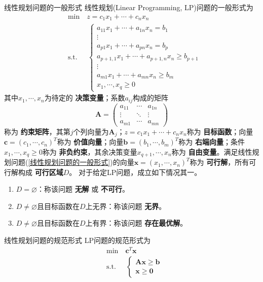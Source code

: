 \documentclass[lang = cn, scheme = chinese, thmcnt = section]{elegantbook}
\newcommand{\bs}{\boldsymbol}          %
\begin{document}
\begin{definition}{线性规划问题的一般形式}
	线性规划(Linear Programming, LP)问题的一般形式为
	\begin{align*}\label{线性规划问题的一般形式}
		& \text{min}  \quad z = c_1 x_1 + \cdots + c_n x_n\\
		& \text{s.t.} \;\, \quad \begin{cases}
			a_{11} x_1 + \cdots + a_{1n} x_n = b_1 \\
			\vdots \\
			a_{p1} x_1 + \cdots + a_{pn} x_n = b_p \\
			a_{p+1,1} x_1 + \cdots + a_{p+1,n} x_n \ge b_{p+1} \\
			\vdots \\
			a_{m1} x_1 + \cdots + a_{mn} x_n \ge b_m \\
			x_1,\cdots,x_q\ge 0
		\end{cases}\tag{*}
	\end{align*}
	其中$x_1,\cdots,x_n$为待定的 {\bf{决策变量}}；系数$a_{ij}$构成的矩阵
	$$
	\bs{A}=\begin{pmatrix}
		a_{11} & \cdots & a_{1n}\\
		\vdots & \ddots & \vdots\\
		a_{m1} & \cdots & a_{mn}
	\end{pmatrix}
	$$
	称为 {\bf{约束矩阵}}，其第$j$个列向量为$\bs{A}_j$；$z = c_1 x_1 + \cdots + c_n x_n$称为 {\bf{目标函数}}；向量$\bs{c}=(c_1,\cdots,c_n)^T$称为 {\bf{价值向量}}；向量$\bs{b}=(b_1,\cdots,b_m)^T$称为 {\bf{右端向量}}；条件$x_1,\cdots,x_q\ge 0$称为 {\bf{非负约束}}，其余决策变量$x_{q+1},\cdots,x_{n}$称为 {\bf{自由变量}}。满足线性规划问题(\ref{线性规划问题的一般形式})的向量$\bs{x}=(x_1,\cdots,x_n)^T$称为 {\bf{可行解}}，所有可行解构成 {\bf{可行区域}}$D$。 对于给定LP问题，成立如下情况其一。
	\begin{enumerate}
		\item $D=\varnothing$：称该问题 {\bf{无解}} 或 {\bf{不可行}}。 
		\item $D\ne\varnothing$且目标函数在$D$上无界：称该问题 {\bf{无界}}。 
		\item $D\ne\varnothing$且目标函数在$D$上有界：称该问题 {\bf{存在最优解}}。 
	\end{enumerate}
\end{definition}

\begin{definition}{线性规划问题的规范形式}
	LP问题的规范形式为
	\begin{align*}\label{线性规划问题的规范形式}
		& \text{min}  \quad \bs{c}^T\bs{x}\\
		& \text{s.t.} \;\, \quad \begin{cases}
			\bs{A} \bs{x} \ge \bs{b}\\
			\bs{x} \ge \bs{0}
		\end{cases}\tag{**}
	\end{align*}
\end{definition}
\end{document}
